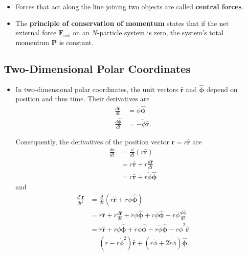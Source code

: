 \documentclass{article}
\renewcommand{\vec}[1]{\boldsymbol{\mathbf{#1}}}
\newcommand{\uvec}[1]{\hat{\vec{#1}}}
\begin{document}
\begin{itemize}
  \item Forces that act along the line joining two objects are called \textbf{central forces}.

  \item The \textbf{principle of conservation of momentum} states that if the net external force $\vec{F}_\text{ext}$ on an $N$-particle system is zero, the system's total momentum $\vec{P}$ is constant.
\end{itemize}

\setcounter{subsection}{6}
\subsection{Two-Dimensional Polar Coordinates}

\begin{itemize}
  \item In two-dimensional polar coordinates, the unit vectors $\uvec{r}$ and $\uvec{\phi}$ depend on position and thus time. Their derivatives are \begin{align*}
          \frac{d \uvec{r}}{d t}    & = \dot{\phi} \uvec{\phi} \\
          \frac{d \uvec{\phi}}{d t} & = -\dot{\phi} \uvec{r}.
        \end{align*}

        Consequently, the derivatives of the position vector $\vec{r} = r \uvec{r}$ are \begin{align*}
          \frac{d \vec{r}}{d t} & = \frac{d}{d t} (r \uvec{r})                  \\
                                & = \dot{r} \uvec{r} + r \frac{d \uvec{r}}{d t} \\
                                & = \dot{r} \uvec{r} + r \dot{\phi} \uvec{\phi}
        \end{align*} and \begin{align*}
          \frac{d^2 \vec{r}}{d t^2} & = \frac{d}{d t} (\dot{r} \uvec{r} + r \dot{\phi} \uvec{\phi})                                                                                              \\
                                    & = \ddot{r} \uvec{r} + \dot{r} \frac{d \uvec{r}}{d t} + \dot{r} \dot{\phi} \uvec{\phi} + r \ddot{\phi} \uvec{\phi} + r \dot{\phi} \frac{d \uvec{\phi}}{d t} \\
                                    & = \ddot{r} \uvec{r} + \dot{r} \dot{\phi} \uvec{\phi} + \dot{r} \dot{\phi} \uvec{\phi} + r \ddot{\phi} \uvec{\phi} - r \dot{\phi}^2 \uvec{r}                \\
                                    & = (\ddot{r} - r \dot{\phi}^2) \uvec{r} + (r \ddot{\phi} + 2 \dot{r} \dot{\phi}) \uvec{\phi}.
        \end{align*}


\end{itemize}
\end{document}
